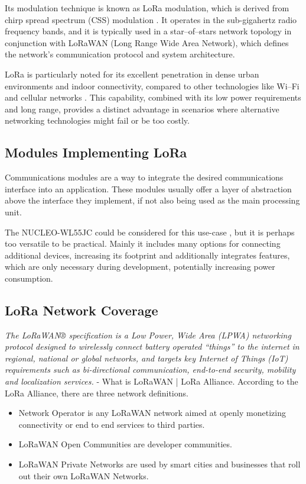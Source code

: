 Its modulation technique is known as LoRa modulation, which is derived from chirp spread spectrum (CSS) modulation \cite{semtech_corporation_sx12612_2024}. It operates in the sub-gigahertz radio frequency bands, and it is typically used in a star--of--stars network topology in conjunction with LoRaWAN (Long Range Wide Area Network), which defines the network's communication protocol and system architecture.

LoRa is particularly noted for its excellent penetration in dense urban environments and indoor connectivity, compared to other technologies like Wi--Fi and cellular networks \cite{stmicroelectronics_lora_2024,semtech_corporation_sx12612_2024,seeedstudio_wio-e5-wireless_2024}. This capability, combined with its low power requirements and long range, provides a distinct advantage in scenarios where alternative networking technologies might fail or be too costly.

\subsection{Modules Implementing LoRa}
Communications modules are a way to integrate the desired communications interface into an application. These modules usually offer a layer of abstraction above the interface they implement, if not also being used as the main processing unit.

The NUCLEO-WL55JC could be considered for this use-case \cite{stmicroelectronics_nucleo-wl55jc_2024}, but it is perhaps too versatile to be practical. Mainly it includes many options for connecting additional devices, increasing its footprint and additionally integrates features, which are only necessary during development, potentially increasing power consumption.

\subsection{LoRa Network Coverage}
\emph{The LoRaWAN® specification is a Low Power, Wide Area (LPWA) networking protocol designed to wirelessly connect battery operated ``things'' to the internet in regional, national or global networks, and targets key Internet of Things (IoT) requirements such as bi-directional communication, end-to-end security, mobility and localization services.} - What is LoRaWAN | LoRa Alliance. According to the LoRa Alliance, there are three network definitions.
\begin{itemize}
    \item Network Operator is any LoRaWAN network aimed at openly monetizing connectivity or end to end services to third parties.
    \item LoRaWAN Open Communities are developer communities.
    \item LoRaWAN Private Networks are used by smart cities and businesses that roll out their own LoRaWAN Networks.
\end{itemize}


